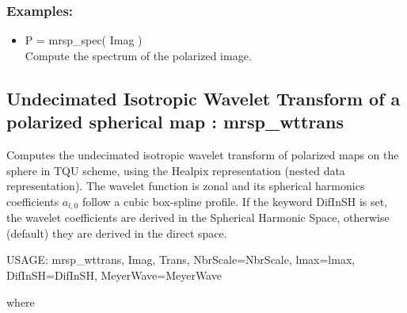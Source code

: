 \subsubsection*{Examples:} 
\begin{itemize}
\item P = mrsp\_spec( Imag ) \\
Compute the spectrum of the polarized image.
\end{itemize}



\subsection{Undecimated Isotropic Wavelet Transform of a polarized spherical map : mrsp\_wttrans}
Computes the undecimated isotropic wavelet transform of polarized maps on the sphere in TQU scheme, 
using the Healpix representation (nested data representation). The wavelet function is zonal and its 
spherical harmonics coefficients $a_{l,0}$ follow a cubic box-spline profile. If the keyword DifInSH is 
set, the wavelet coefficients are derived in the Spherical Harmonic Space, otherwise (default) they 
are derived in the direct space.
{\bf
\begin{center}
     USAGE: mrsp\_wttrans, Imag, Trans, NbrScale=NbrScale, lmax=lmax, DifInSH=DifInSH, MeyerWave=MeyerWave
\end{center}}
where
